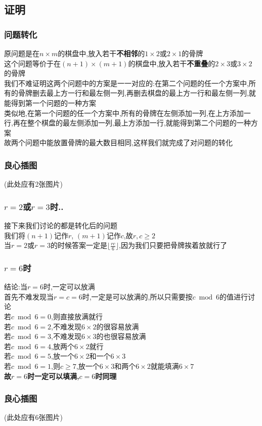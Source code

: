 \documentclass{beamer}
\begin{document}
		\subsection{证明}
			\begin{frame}\frametitle{问题转化}
				原问题是在$n\times m$的棋盘中,放入若干\textbf{不相邻}的$1\times2$或$2\times1$的骨牌\\
				这个问题等价于在$(n+1)\times(m+1)$的棋盘中,放入若干\textbf{不重叠}的$2\times3$或$3\times2$的骨牌\\
				我们不难证明这两个问题中的方案是一一对应的:在第二个问题的任一个方案中,所有的骨牌删去最上方一行和最左侧一列,再删去棋盘的最上方一行和最左侧一列,就能得到第一个问题的一种方案\\
				类似地,在第一个问题的任一个方案中,所有的骨牌在左侧添加一列,在上方添加一行,再在整个棋盘的最左侧添加一列,最上方添加一行,就能得到第二个问题的一种方案\\
				故两个问题中能放置骨牌的最大数目相同,这样我们就完成了对问题的转化
			\end{frame}
			\begin{frame}\frametitle{良心插图}
				(此处应有2张图片)
			\end{frame}
			\begin{frame}\frametitle{$r=2$或$r=3$时..}
				接下来我们讨论的都是转化后的问题\\
				我们将$(n+1)$记作$r$, $(m+1)$记作$c$,故$r,c\ge2$\\
				当$r=2$或$r=3$的时候答案一定是$\lfloor\frac{rc}6\rfloor$,因为我们只要把骨牌挨着放就行了
			\end{frame}
			\begin{frame}\frametitle{$r=6$时}
				结论:当$r=6$时,一定可以放满\\
				首先不难发现当$r=c=6$时,一定是可以放满的,所以只需要按$c\bmod6$的值进行讨论\\
				若$c\bmod6=0$,则直接放满就行\\
				若$c\bmod6=2$,不难发现$6\times2$的很容易放满\\
				若$c\bmod6=3$,不难发现$6\times3$的也很容易放满\\
				若$c\bmod6=4$,放两个$6\times2$就行\\
				若$c\bmod6=5$,放一个$6\times2$和一个$6\times3$\\
				若$c\bmod6=1$,则$c\ge7$,放一个$6\times3$和两个$6\times2$就能填满$6\times7$\\
				\textbf{故$r=6$时一定可以填满,$c=6$时同理}
			\end{frame}
			\begin{frame}\frametitle{良心插图}
				(此处应有6张图片)
			\end{frame}
\end{document}
